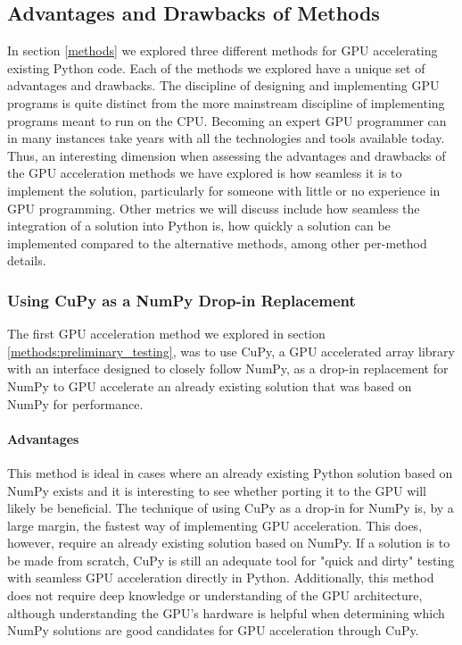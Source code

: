 \subsection{Advantages and Drawbacks of Methods} \label{discussion:advantages_and_drawbacks_of_methods}
In section \ref{methods} we explored three different methods for GPU accelerating existing Python code.
Each of the methods we explored have a unique set of advantages and drawbacks.
The discipline of designing and implementing GPU programs is quite distinct from the more mainstream discipline of implementing programs meant to run on the CPU.
Becoming an expert GPU programmer can in many instances take years with all the technologies and tools available today.
Thus, an interesting dimension when assessing the advantages and drawbacks of the GPU acceleration methods we have explored is how seamless it is to implement the solution, particularly for someone with little or no experience in GPU programming.
Other metrics we will discuss include how seamless the integration of a solution into Python is, how quickly a solution can be implemented compared to the alternative methods, among other per-method details.

\subsubsection{Using CuPy as a NumPy Drop-in Replacement} \label{discussion:using_cupy_as_a_numpy_drop_in_replacement}
The first GPU acceleration method we explored in section \ref{methods:preliminary_testing}, was to use CuPy, a GPU accelerated array library with an interface designed to closely follow NumPy, as a drop-in replacement for NumPy to GPU accelerate an already existing solution that was based on NumPy for performance.

\paragraph{Advantages}
This method is ideal in cases where an already existing Python solution based on NumPy exists and it is interesting to see whether porting it to the GPU will likely be beneficial.
The technique of using CuPy as a drop-in for NumPy is, by a large margin, the fastest way of implementing GPU acceleration.
This does, however, require an already existing solution based on NumPy.
If a solution is to be made from scratch, CuPy is still an adequate tool for "quick and dirty" testing with seamless GPU acceleration directly in Python.
Additionally, this method does not require deep knowledge or understanding of the GPU architecture, although understanding the GPU's hardware is helpful when determining which NumPy solutions are good candidates for GPU acceleration through CuPy.

